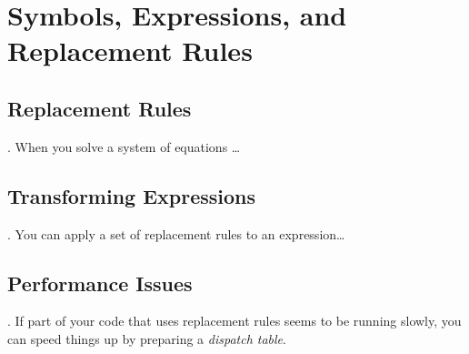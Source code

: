 \chapter{Symbols, Expressions, and Replacement Rules}
\label{chap:Symbols}

\section{Replacement Rules}. When you solve a system of equations \ldots

\section{Transforming Expressions}. You can apply a set of replacement rules to an expression\ldots

\section{Performance Issues}. If part of your code that uses replacement rules seems to be running slowly, you can speed things up by preparing a \emph{dispatch table}.
